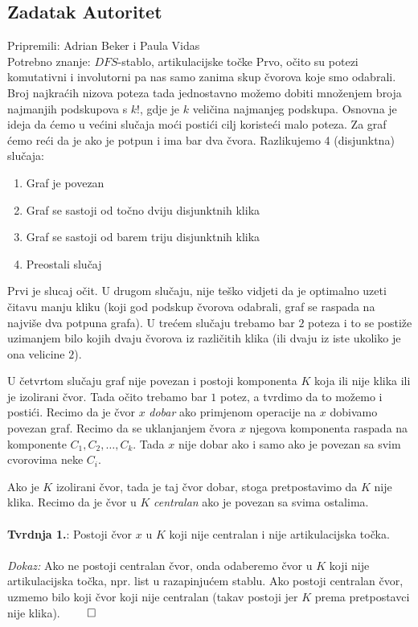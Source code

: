\subsection*{Zadatak Autoritet}
\textsf{Pripremili: Adrian Beker i Paula Vidas}\\
\textsf{Potrebno znanje: $DFS$-stablo, artikulacijske točke}
Prvo, očito su potezi komutativni i involutorni pa nas samo zanima skup čvorova koje smo odabrali. Broj najkraćih nizova poteza tada jednostavno možemo dobiti množenjem broja najmanjih podskupova s $k!$, gdje je $k$ veličina najmanjeg podskupa. Osnovna je ideja da ćemo u većini slučaja moći postići cilj koristeći malo poteza. Za graf ćemo reći da je  ako je potpun i ima bar dva čvora. Razlikujemo 4 (disjunktna) slučaja:

\begin{enumerate}
    \item Graf je povezan
    \item Graf se sastoji od točno dviju disjunktnih klika
    \item Graf se sastoji od barem triju disjunktnih klika
    \item Preostali slučaj
\end{enumerate}
Prvi je slucaj očit. U drugom slučaju, nije teško vidjeti da je optimalno uzeti čitavu manju kliku (koji god podskup čvorova odabrali, graf se raspada na najviše dva potpuna grafa).
U trećem slučaju trebamo bar $2$ poteza i to se postiže uzimanjem bilo kojih dvaju čvorova iz različitih klika (ili dvaju iz iste ukoliko je ona velicine $2$).

U četvrtom slučaju graf nije povezan i postoji komponenta $K$ koja ili nije klika ili je izolirani čvor. Tada očito trebamo bar $1$ potez, a tvrdimo da to možemo i postići. Recimo da je čvor $x$ \textit{dobar} ako primjenom operacije na $x$ dobivamo povezan graf. Recimo da se uklanjanjem čvora $x$ njegova komponenta raspada na komponente $C_1, C_2, …, C_k$. Tada $x$ nije dobar ako i samo ako je povezan sa svim cvorovima neke $C_i$.

Ako je $K$ izolirani čvor, tada je taj čvor dobar, stoga pretpostavimo da $K$ nije klika. Recimo da je čvor u $K$ \textit{centralan} ako je povezan sa svima ostalima.
\\\\
\textbf{Tvrdnja 1.}: Postoji čvor $x$ u $K$ koji nije centralan i nije artikulacijska točka.
\\\\
\textit{Dokaz:} Ako ne postoji centralan čvor, onda odaberemo čvor u $K$ koji nije artikulacijska točka, npr. list u razapinjućem stablu. Ako postoji centralan čvor, uzmemo bilo koji čvor koji nije centralan (takav postoji jer $K$ prema pretpostavci nije klika). $\qed$

